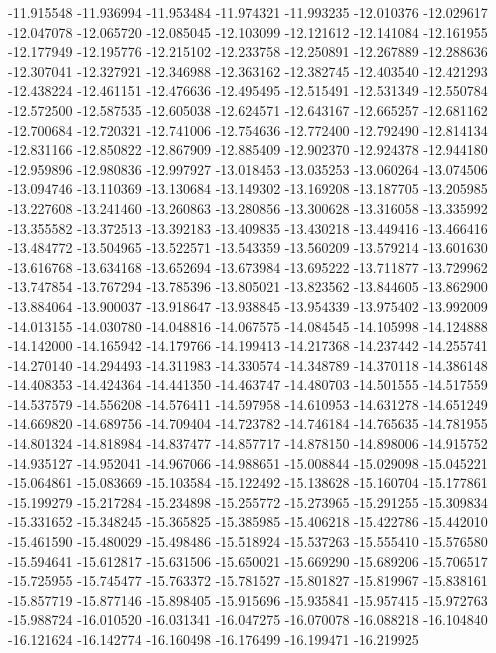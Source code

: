 -11.915548
-11.936994
-11.953484
-11.974321
-11.993235
-12.010376
-12.029617
-12.047078
-12.065720
-12.085045
-12.103099
-12.121612
-12.141084
-12.161955
-12.177949
-12.195776
-12.215102
-12.233758
-12.250891
-12.267889
-12.288636
-12.307041
-12.327921
-12.346988
-12.363162
-12.382745
-12.403540
-12.421293
-12.438224
-12.461151
-12.476636
-12.495495
-12.515491
-12.531349
-12.550784
-12.572500
-12.587535
-12.605038
-12.624571
-12.643167
-12.665257
-12.681162
-12.700684
-12.720321
-12.741006
-12.754636
-12.772400
-12.792490
-12.814134
-12.831166
-12.850822
-12.867909
-12.885409
-12.902370
-12.924378
-12.944180
-12.959896
-12.980836
-12.997927
-13.018453
-13.035253
-13.060264
-13.074506
-13.094746
-13.110369
-13.130684
-13.149302
-13.169208
-13.187705
-13.205985
-13.227608
-13.241460
-13.260863
-13.280856
-13.300628
-13.316058
-13.335992
-13.355582
-13.372513
-13.392183
-13.409835
-13.430218
-13.449416
-13.466416
-13.484772
-13.504965
-13.522571
-13.543359
-13.560209
-13.579214
-13.601630
-13.616768
-13.634168
-13.652694
-13.673984
-13.695222
-13.711877
-13.729962
-13.747854
-13.767294
-13.785396
-13.805021
-13.823562
-13.844605
-13.862900
-13.884064
-13.900037
-13.918647
-13.938845
-13.954339
-13.975402
-13.992009
-14.013155
-14.030780
-14.048816
-14.067575
-14.084545
-14.105998
-14.124888
-14.142000
-14.165942
-14.179766
-14.199413
-14.217368
-14.237442
-14.255741
-14.270140
-14.294493
-14.311983
-14.330574
-14.348789
-14.370118
-14.386148
-14.408353
-14.424364
-14.441350
-14.463747
-14.480703
-14.501555
-14.517559
-14.537579
-14.556208
-14.576411
-14.597958
-14.610953
-14.631278
-14.651249
-14.669820
-14.689756
-14.709404
-14.723782
-14.746184
-14.765635
-14.781955
-14.801324
-14.818984
-14.837477
-14.857717
-14.878150
-14.898006
-14.915752
-14.935127
-14.952041
-14.967066
-14.988651
-15.008844
-15.029098
-15.045221
-15.064861
-15.083669
-15.103584
-15.122492
-15.138628
-15.160704
-15.177861
-15.199279
-15.217284
-15.234898
-15.255772
-15.273965
-15.291255
-15.309834
-15.331652
-15.348245
-15.365825
-15.385985
-15.406218
-15.422786
-15.442010
-15.461590
-15.480029
-15.498486
-15.518924
-15.537263
-15.555410
-15.576580
-15.594641
-15.612817
-15.631506
-15.650021
-15.669290
-15.689206
-15.706517
-15.725955
-15.745477
-15.763372
-15.781527
-15.801827
-15.819967
-15.838161
-15.857719
-15.877146
-15.898405
-15.915696
-15.935841
-15.957415
-15.972763
-15.988724
-16.010520
-16.031341
-16.047275
-16.070078
-16.088218
-16.104840
-16.121624
-16.142774
-16.160498
-16.176499
-16.199471
-16.219925
